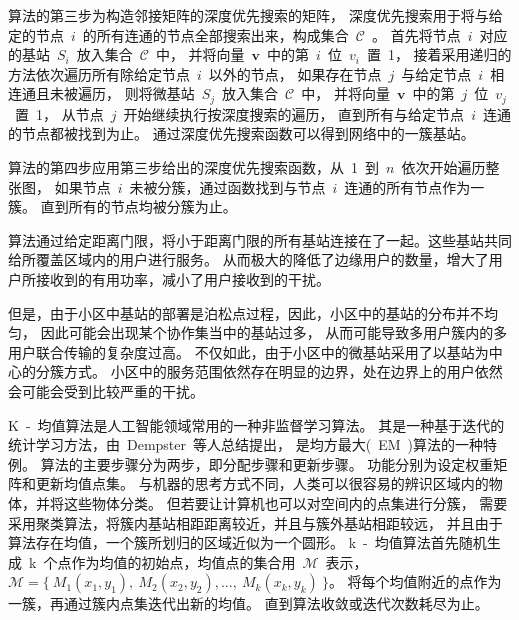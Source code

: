 算法的第三步为构造邻接矩阵的深度优先搜索的矩阵，
深度优先搜索用于将与给定的节点~$i$~的所有连通的节点全部搜索出来，构成集合~$\mathcal{C}$~。
首先将节点~$i$~对应的基站~$S_i$~放入集合~$\mathcal{C}$~中，
并将向量~$\mathbf{v}$~中的第~$i$~位~$v_i$~置~1，
接着采用递归的方法依次遍历所有除给定节点~$i$~以外的节点，
如果存在节点~$j$~与给定节点~$i$~相连通且未被遍历，
则将微基站~$S_j$~放入集合~$\mathcal{C}$~中，
并将向量~$\mathbf{v}$~中的第~$j$~位~$v_j$~置~1，
从节点~$j$~开始继续执行按深度搜索的遍历，
直到所有与给定节点~$i$~连通的节点都被找到为止。
通过深度优先搜索函数可以得到网络中的一簇基站。

算法的第四步应用第三步给出的深度优先搜索函数，从~1~到~$n$~依次开始遍历整张图，
如果节点~$i$~未被分簇，通过函数找到与节点~$i$~连通的所有节点作为一簇。
直到所有的节点均被分簇为止。


算法通过给定距离门限，将小于距离门限的所有基站连接在了一起。这些基站共同给所覆盖区域内的用户进行服务。
从而极大的降低了边缘用户的数量，增大了用户所接收到的有用功率，减小了用户接收到的干扰。

但是，由于小区中基站的部署是泊松点过程，因此，小区中的基站的分布并不均匀，
因此可能会出现某个协作集当中的基站过多，
从而可能导致多用户簇内的多用户联合传输的复杂度过高。
不仅如此，由于小区中的微基站采用了以基站为中心的分簇方式。
小区中的服务范围依然存在明显的边界，处在边界上的用户依然会可能会受到比较严重的干扰。

K~-~均值算法是人工智能领域常用的一种非监督学习算法。
其是一种基于迭代的统计学习方法，由~Dempster~等人总结提出，
是均方最大(~EM~)算法的一种特例。
算法的主要步骤分为两步，即分配步骤和更新步骤。
功能分别为设定权重矩阵和更新均值点集。
与机器的思考方式不同，人类可以很容易的辨识区域内的物体，并将这些物体分类。
但若要让计算机也可以对空间内的点集进行分簇，
需要采用聚类算法，将簇内基站相距距离较近，并且与簇外基站相距较远，
并且由于算法存在均值，一个簇所划归的区域近似为一个圆形。
k~-~均值算法首先随机生成~k~个点作为均值的初始点，均值点的集合用~$\mathcal{M}$~表示，
$\mathcal{M}=\{~M_1(x_1,y_1),~M_2(x_2,y_2),\dots,~M_k(x_k,y_k)~\}$。
将每个均值附近的点作为一簇，再通过簇内点集迭代出新的均值。
直到算法收敛或迭代次数耗尽为止。

